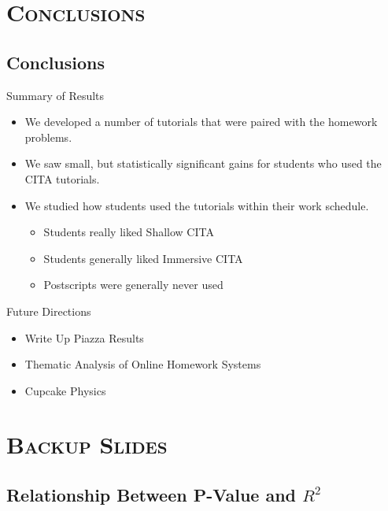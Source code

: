 \documentclass[xcolor=x11names,compress]{beamer}
\begin{document}

\section{\scshape Conclusions}

\subsection{Conclusions}

\begin{frame}{Summary of Results}
	\begin{itemize}
		\item We developed a number of tutorials that were paired with the homework problems.
		\item We saw small, but statistically significant gains for students who used the CITA tutorials.
		\item We studied how students used the tutorials within their work schedule.
		\begin{itemize}
			\item Students really liked Shallow CITA
			\item Students generally liked Immersive CITA
			\item Postscripts were generally never used
		\end{itemize}
	\end{itemize}
\end{frame}

\begin{frame}{Future Directions}
	\begin{itemize}
		\item Write Up Piazza Results
		\item Thematic Analysis of Online Homework Systems
		\item Cupcake Physics
	\end{itemize}
\end{frame}


\appendix
\section{\scshape Backup Slides}

\subsection{Relationship Between P-Value and $R^2$}
\end{document}
